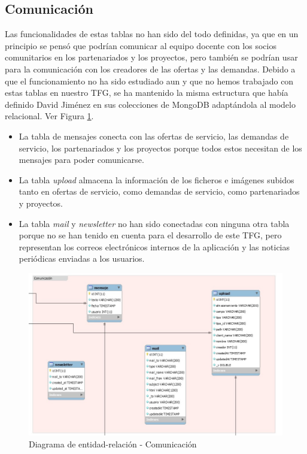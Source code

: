 \documentclass[11pt]{book}
\begin{document}
\subsection{Comunicación}
Las funcionalidades de estas tablas no han sido del todo definidas, ya que en un principio se pensó que podrían comunicar al equipo docente con los socios comunitarios en los partenariados y los proyectos, pero también se podrían usar para la comunicación con los creadores de las ofertas y las demandas. Debido a que el funcionamiento no ha sido estudiado aun y que no hemos trabajado con estas tablas en nuestro TFG, se ha mantenido la misma estructura que había definido David Jiménez en sus colecciones de MongoDB adaptándola al modelo relacional. Ver Figura \ref{fig:comunicacion}. 
\begin{itemize} 
	\item La tabla de mensajes conecta con las ofertas de servicio, las demandas de servicio, los partenariados y los proyectos porque todos estos necesitan de los mensajes para poder comunicarse.
	\item La tabla \textit{upload} almacena la información de los ficheros e imágenes subidos tanto en ofertas de servicio, como demandas de servicio, como partenariados y proyectos.
	\item La tabla \textit{mail} y \textit{newsletter} no han sido conectadas con ninguna otra tabla porque no se han tenido en cuenta para el desarrollo de este TFG, pero representan los correos electrónicos internos de la aplicación y las noticias periódicas enviadas a los usuarios.
\end{itemize}
\begin{figure}[t]
	\centering
	\includegraphics[scale=0.6]{comunicacion}
	\caption{Diagrama de entidad-relación - Comunicación}
	\label{fig:comunicacion}
\end{figure}


\end{document}
